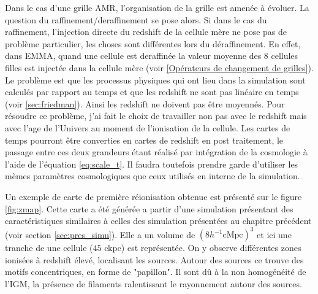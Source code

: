 Dans le cas d'une grille \ac{AMR}, l'organisation de la grille est amenée à évoluer.
La question du raffinement/deraffinement se pose alors.
Si dans le cas du raffinement, l'injection directe du redshift de la cellule mère ne pose pas de problème particulier, les choses sont différentes lors du déraffinement.
En effet, dans EMMA, quand une cellule est deraffinée la valeur moyenne des 8 cellules filles est injectée dans la cellule mère (voir \ref{Opérateurs de changement de grilles}).
Le problème est que les processus physiques qui ont lieu dans la simulation sont calculés par rapport au temps et que les redshift ne sont pas linéaire en temps (voir \ref{sec:friedman}).
Ainsi les redshift ne doivent pas être moyennés.
Pour résoudre ce problème, j'ai fait le choix de travailler non pas avec le redshift mais avec l'age de l'Univers au moment de l'ionisation de la cellule.
Les cartes de temps pourront être converties en cartes de redshift en post traitement, le passage entre ces deux grandeurs étant réalisé par intégration de la cosmologie à l'aide de l'équation \ref{eq:scale_t}.
Il faudra toutefois prendre garde d'utiliser les mèmes paramètres cosmologiques que ceux utilisés en interne de la simulation.

Un exemple de carte de première réionisation obtenue est présenté sur le figure \ref{fig:zmap}.
Cette carte a été générée a partir d'une simulation présentant des caractéristiques similaires à celles des simulation présentées au chapitre précédent (voir section \ref{sec:pres_simu}).
Elle a un volume de $\left( 8h^{-1} \mathrm{cMpc} \right) ^3$ et ici une tranche de une cellule ($45$ ckpc) est représentée.
On y observe différentes zones ionisées à redshift élevé, localisant les sources.
Autour des sources ce trouve des motifs concentriques, en forme de "papillon".
Il sont dû à la non homogénéité de l'\ac{IGM}, la présence de filaments ralentissant le rayonnement autour des sources.

